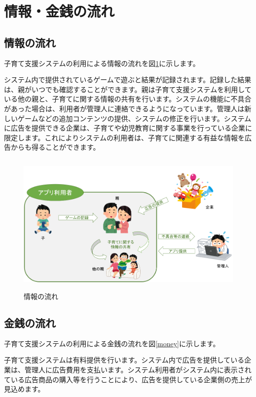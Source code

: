 \documentclass[a4j]{jarticle}
\begin{document}
\section{情報・金銭の流れ}

\subsection{情報の流れ}
子育て支援システムの利用による情報の流れを図\ref{info}に示します。

システム内で提供されているゲームで遊ぶと結果が記録されます。記録した結果は、親がいつでも確認することができます。親は子育て支援システムを利用している他の親と、子育てに関する情報の共有を行います。システムの機能に不具合があった場合は、利用者が管理人に連絡できるようになっています。管理人は新しいゲームなどの追加コンテンツの提供、システムの修正を行います。システムに広告を提供できる企業は、子育てや幼児教育に関する事業を行っている企業に限定します。これによりシステムの利用者は、子育てに関連する有益な情報を広告からも得ることができます。
\begin{figure}[h]
  \begin{center}
    \includegraphics[width = 14cm, height = 7cm]{section5_info.png}
    \caption{情報の流れ}
    \label{info}
  \end{center}
\end{figure}

\newpage
\subsection{金銭の流れ}
子育て支援システムの利用による金銭の流れを図\ref{money}に示します。

子育て支援システムは有料提供を行います。システム内で広告を提供している企業は、管理人に広告費用を支払います。システム利用者がシステム内に表示されている広告商品の購入等を行うことにより、広告を提供している企業側の売上が見込めます。
\end{document}
